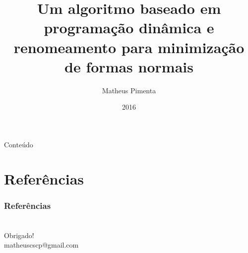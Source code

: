 \documentclass{beamer}
\title[]{Um algoritmo baseado em programação dinâmica e renomeamento para minimização de formas normais}
\author{Matheus Pimenta}
\institute[UnB]{Universidade de Brasília}
\date{2016}
\begin{document}
\begin{frame}
\titlepage
\end{frame}

\begin{frame}{Conteúdo}
  \tableofcontents
\end{frame}







\section{Referências}

\begin{frame}[allowframebreaks]
	\frametitle{Referências}
	
	
\end{frame}

\section*{}

\begin{frame}
	\begin{center}
		Obrigado!\\
		matheuscscp@gmail.com
	\end{center}
\end{frame}
\end{document}
